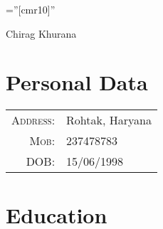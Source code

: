 \documentclass[a4paper,10pt]{article}
\begin{document}
\pagestyle{empty}
\font\fb=''[cmr10]''
\par{\centering
		{\Huge Chirag Khurana
	}\bigskip\par}
\section{Personal Data}
\begin{tabular}{rl}
\textsc{Address:}&Rohtak, Haryana\\
\textsc{Mob:}&237478783\\
\textsc{DOB:}&15/06/1998\\
\end{tabular}
\section{Education}
\begin{tabular}{rl}
\end{tabular}
\end{document}
